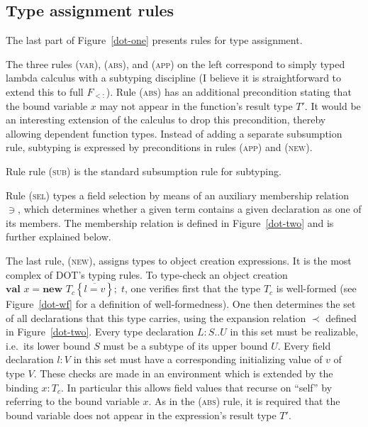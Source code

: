 \documentclass{llncs}
\newif\ifdep\depfalse
\newcommand{\expand}{\prec}
\newcommand{\sub}{<:}
\newcommand{\sing}{.\textbf{type}}
\newcommand{\ldefs}[1]{\left\{#1\right\}}
\newcommand{\seq}[1]{\overline{#1}}
\newcommand{\new}[3]{\textbf{val }#1 = \textbf{new }#2 ;\; #3}
\newcommand{\Ldecl}[3]{#1 : #2..#3}%
\newcommand{\ldecl}[2]{#1 : #2}
\begin{document}
\subsection*{Type assignment rules}

The last part of Figure~\ref{dot-one} presents rules for type
assignment.  
\ifdep
The four rules (\textsc{var}), (\textsc{abs}), (\textsc{app-term}) and
(\textsc{app-path}) correspond to dependently typed lambda calculus
with a subtyping discipline. There are two rules for
applications. Rule (\textsc{app-term}) implements the standard
application rule if the function's result type does not depend on its
argument type. Rule (\textsc{app-path}) applies to dependently typed
functions which can only be applied to paths.
Instead of adding a separate subsumption rule,
subtyping is expressed by preconditions in the application rules and
also in rule (\textsc{new}).  
\else
The three rules (\textsc{var}), (\textsc{abs}), and
(\textsc{app}) on the left correspond to simply typed lambda calculus
with a subtyping discipline (I believe it is straightforward to extend
this to full $F_{\sub}$). Rule (\textsc{abs}) has an additional precondition
stating that the bound variable $x$ may not appear in the function's
result type $T'$. It would be an interesting extension of the calculus
to drop this precondition, thereby allowing dependent function types.
Instead of adding a separate subsumption rule,
subtyping is expressed by preconditions in rules (\textsc{app}) and
(\textsc{new}).  
\fi
Rule rule (\textsc{sub}) is the standard subsumption rule for subtyping.


Rule (\textsc{sel}) types a field selection by means of an auxiliary
membership relation $\ni$, which determines whether a given term contains a given
declaration as one of its members. The membership relation is defined in
Figure~\ref{dot-two} and is further explained below.

The last rule, (\textsc{new}), assigns types to object creation
expressions. It is the most complex of DOT's typing rules.  To
type-check an object creation $\new x {T_c \ldefs {\seq{l = v}}} t$,
one verifies first that the type $T_c$ is well-formed (see
Figure~\ref{dot-wf} for a definition of well-formedness).  One then
determines the set of all declarations that this type carries, using
the expansion relation $\expand$ defined in Figure~\ref{dot-two}.
Every type declaration $\Ldecl L S U$ in this set must be realizable,
i.e.\ its lower bound $S$ must be a subtype of its upper bound $U$.
Every field declaration $\ldecl l V$ in this set must have a
corresponding initializing value of $v$ of type $V$.  These checks are
made in an environment which is extended by the binding $x: T_c$. In
particular this allows field values that recurse on ``self'' by
referring to the bound variable $x$. As in the (\textsc{abs}) rule, it
is required that the bound variable does not appear in the
expression's result type $T'$.
\end{document}
